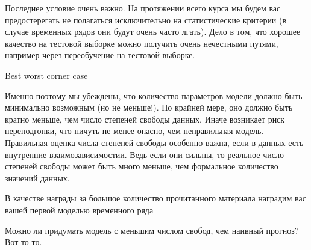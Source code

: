 Последнее условие очень важно. На протяжении всего курса мы будем вас
предостерегать не полагаться исключительно на статистические критерии
(в случае временных рядов они будут очень часто лгать). Дело в том,
что хорошее качество на тестовой выборке можно получить очень
нечестными путями, например через переобучение на тестовой выборке.

Best worst corner case

Именно поэтому мы убеждены, что количество параметров модели должно
быть минимально возможным (но не меньше!). По крайней мере, оно
должно быть кратно меньше, чем число степеней
свободы данных. Иначе возникает риск переподгонки, что ничуть не
менее опасно, чем неправильная модель. Правильная оценка числа
степеней свободы особенно важна, если в данных есть внутренние
взаимозависимостии. Ведь если они сильны, то реальное число степеней
свободы может быть много меньше, чем формальное количество значений
данных.


В качестве награды за большое количество прочитанного материала
наградим вас вашей первой моделью временного ряда



Можно ли придумать модель с меньшим числом свобод, чем наивный
прогноз? Вот то-то.